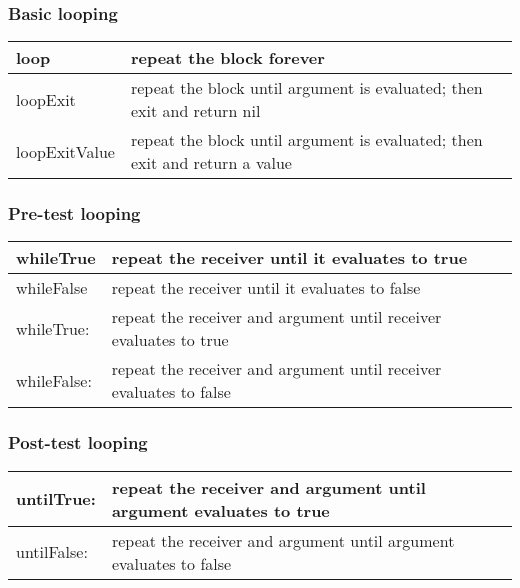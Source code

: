 \documentclass[letterpaper,10pt,english]{sphinxmanual}
\begin{document}
\subsubsection{Basic looping}
\label{\detokenize{usefulselectors:basic-looping}}
\noindent\begin{tabulary}{\linewidth}{p{5cm} p{10cm}}
\hline

loop
&
repeat the block forever
\\
\hline
loopExit
&
repeat the block until argument is evaluated; then exit and return nil
\\
\hline
loopExitValue
&
repeat the block until argument is evaluated; then exit and return a value
\\
\hline\end{tabulary}



\subsubsection{Pre-test looping}
\label{\detokenize{usefulselectors:pre-test-looping}}
\noindent\begin{tabulary}{\linewidth}{p{5cm} p{10cm}}
\hline

whileTrue
&
repeat the receiver until it evaluates to true
\\
\hline
whileFalse
&
repeat the receiver until it evaluates to false
\\
\hline
whileTrue:
&
repeat the receiver and argument until receiver evaluates to true
\\
\hline
whileFalse:
&
repeat the receiver and argument until receiver evaluates to false
\\
\hline\end{tabulary}



\subsubsection{Post-test looping}
\label{\detokenize{usefulselectors:post-test-looping}}
\noindent\begin{tabulary}{\linewidth}{p{5cm} p{10cm}}
\hline

untilTrue:
&
repeat the receiver and argument until argument evaluates to true
\\
\hline
untilFalse:
&
repeat the receiver and argument until argument evaluates to false
\\
\hline\end{tabulary}
\end{document}

